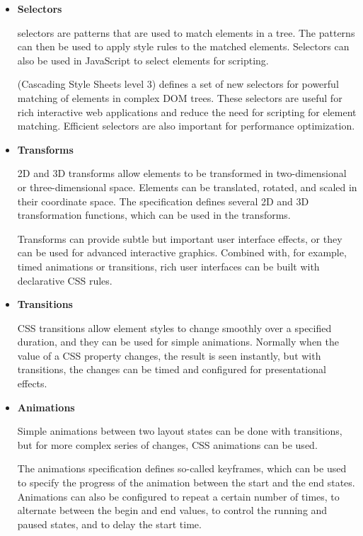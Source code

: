 \begin{itemize}

\item \textbf{Selectors}

   selectors are patterns that are used to match elements in
  a  tree. The patterns can then be used to apply style
  rules to the matched elements. Selectors can also be used in
  JavaScript to select elements for scripting.

   (Cascading Style Sheets level 3) defines a set of new
  selectors \cite{CSS3Selectors} for powerful matching of elements in
  complex DOM trees. These selectors are useful for rich interactive
  web applications and reduce the need for scripting for element
  matching. Efficient selectors are also important for performance
  optimization.

\item \textbf{Transforms}

  2D and 3D transforms \cite{CSStransforms} allow elements to be
  transformed in two-dimensional or three-dimensional space. Elements
  can be translated, rotated, and scaled in their coordinate
  space. The specification defines several 2D and 3D transformation
  functions, which can be used in the transforms.

  Transforms can provide subtle but important user interface effects,
  or they can be used for advanced interactive graphics. Combined
  with, for example, timed animations or transitions, rich user
  interfaces can be built with declarative CSS rules.

\item \textbf{Transitions}

  CSS transitions \cite{CSStransitions} allow element styles to change
  smoothly over a specified duration, and they can be used for simple
  animations. Normally when the value of a CSS property changes, the
  result is seen instantly, but with transitions, the changes can be
  timed and configured for presentational effects.

\item \textbf{Animations}

  Simple animations between two layout states can be done with
  transitions, but for more complex series of changes, CSS animations
  \cite{CSSanimations} can be used.

  The animations specification defines so-called keyframes, which can
  be used to specify the progress of the animation between the start
  and the end states. Animations can also be configured to repeat a
  certain number of times, to alternate between the begin and end
  values, to control the running and paused states, and to delay the
  start time. \cite{CSSanimations}


\end{itemize}
